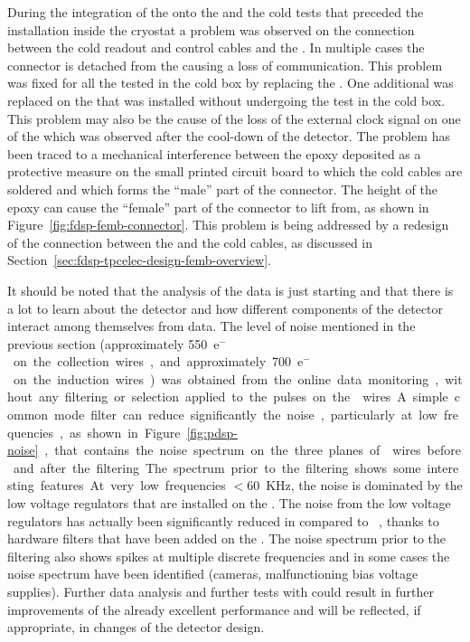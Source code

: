 During the integration of the  onto the 
and the cold tests that preceded the  installation
inside the  cryostat a problem was observed on the 
connection between the cold readout and control cables and the
. In multiple cases the connector is detached from
the  causing a loss of communication. This problem 
was fixed for all the  tested in the cold box by
replacing the . One additional  was 
replaced on the  that was installed without undergoing 
the test in the cold box. This problem may also be the cause
of the loss of the external clock signal on one of the 
which was observed after the cool-down of the detector.
The problem has been traced to a mechanical interference between 
the epoxy deposited as a protective measure on the small printed circuit
board to which the cold cables are soldered and which forms the
``male'' part of the connector. The height of the epoxy can cause
the ``female'' part of the connector to lift from, as shown in
Figure~\ref{fig:fdsp-femb-connector}. This problem is being 
addressed by a redesign of the connection between the 
and the cold cables, as discussed in Section~\ref{sec:fdsp-tpcelec-design-femb-overview}.

It should be noted that the analysis of the  data
is just starting and that there is a lot to learn about the
detector and how different components of the detector interact
among themselves from data. The level of noise mentioned in
the previous section (approximately \SI{550}{e$^-$} on the collection wires,
and approximately \SI{700}{e$^-$} on the induction wires) 
was obtained from the online data monitoring, without any
filtering or selection applied to the pulses on the 
wires.A simple common mode filter can reduce significantly the 
noise, particularly at low frequencies, as shown in Figure~\ref{fig:pdsp-noise},
that contains the noise spectrum on the three planes of 
wires before and after the filtering. The spectrum prior to
the filtering shows some interesting features. At very low
frequencies $<$\SI{60}{KHz}, the noise is dominated by the
low voltage regulators that are installed on the .
The noise from the low voltage regulators has actually
been significantly reduced in  compared to
~\cite{Acciarri:2017sde}, thanks to 
hardware filters that have been added on the  
. The noise spectrum prior to the filtering
also shows spikes at multiple discrete frequencies and in
some cases the noise spectrum have been identified (cameras,
malfunctioning bias voltage supplies). Further data analysis
and further tests with  could result in further
improvements of the already excellent  performance
and will be reflected, if appropriate, in changes of the
detector design.

